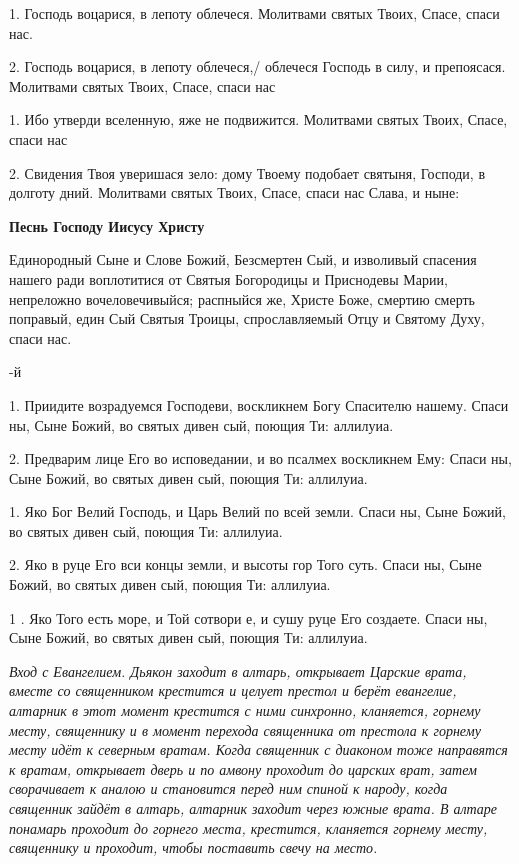 1. Господь воцарися, в лепоту облечеся. Молитвами святых Твоих, Спасе, спаси нас. 


2. Господь воцарися, в лепоту облечеся,/ облечеся Господь в силу, и препоясася. Молитвами святых Твоих, Спасе, спаси нас 


1. Ибо утверди вселенную, яже не подвижится. Молитвами святых Твоих, Спасе, спаси нас 


2. Свидения Твоя уверишася зело: дому Твоему подобает святыня, Господи, в долготу дний. Молитвами святых Твоих, Спасе, спаси нас Слава, и ныне:


\medskip\bfseries  Песнь Господу Иисусу Христу\normalfont{}\nopagebreak


Единородный Сыне и Слове Божий, Безсмертен Сый, и изволивый спасения нашего ради воплотитися от Святыя Богородицы и Приснодевы Марии, непреложно вочеловечивыйся; распныйся же, Христе Боже, смертию смерть поправый, един Сый Святыя Троицы, спрославляемый Отцу и Святому Духу, спаси нас. 

-й 


1. Приидите возрадуемся Господеви, воскликнем Богу Спасителю нашему. Спаси ны, Сыне Божий, во святых дивен сый, поющия Ти: аллилуиа. 


2. Предварим лице Его во исповедании, и во псалмех воскликнем Ему: Спаси ны, Сыне Божий, во святых дивен сый, поющия Ти: аллилуиа. 


1. Яко Бог Велий Господь, и Царь Велий по всей земли. Спаси ны, Сыне Божий, во святых дивен сый, поющия Ти: аллилуиа. 


2. Яко в руце Его вси концы земли, и высоты гор Того суть. Спаси ны, Сыне Божий, во святых дивен сый, поющия Ти: аллилуиа. 


1 . Яко Того есть море, и Той сотвори е, и сушу руце Его создаете. Спаси ны, Сыне Божий, во святых дивен сый, поющия Ти: аллилуиа. 


\itshape Вход с Евангелием. Дьякон заходит в алтарь, открывает Царские врата, вместе со священником крестится и целует престол и берёт евангелие, алтарник в этот момент крестится с ними синхронно, кланяется, горнему месту, священнику и в момент перехода священника от престола к горнему месту идёт к северным вратам. Когда священник с диаконом тоже направятся к вратам, открывает дверь и по амвону проходит до царских врат, затем сворачивает к аналою и становится перед ним спиной к народу, когда священник зайдёт в алтарь, алтарник заходит через южные врата. В алтаре понамарь проходит до горнего места, крестится, кланяется горнему месту, священнику и проходит, чтобы поставить свечу на место.\normalfont{}



